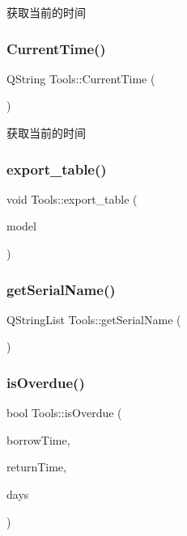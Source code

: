获取当前的时间 

\mbox{\label{class_tools_af10c90501143838d9af896a60026668d}} 
\subsubsection{\texorpdfstring{CurrentTime()}{CurrentTime()}}
{\footnotesize\ttfamily Q\+String Tools\+::\+Current\+Time (\begin{DoxyParamCaption}{ }\end{DoxyParamCaption})}



获取当前的时间 

\mbox{\label{class_tools_af6c4eaadfb21ee231cbc4d6384250629}} 
\subsubsection{\texorpdfstring{export\_table()}{export\_table()}}
{\footnotesize\ttfamily void Tools\+::export\+\_\+table (\begin{DoxyParamCaption}\item[{const Q\+Abstract\+Item\+Model \&}]{model }\end{DoxyParamCaption})}

\mbox{\label{class_tools_ac18eb440bd7a33e8e242df2cc4d4d4bc}} 
\subsubsection{\texorpdfstring{getSerialName()}{getSerialName()}}
{\footnotesize\ttfamily Q\+String\+List Tools\+::get\+Serial\+Name (\begin{DoxyParamCaption}{ }\end{DoxyParamCaption})}

\mbox{\label{class_tools_a178182aebac5d407b60720335c04822a}} 
\subsubsection{\texorpdfstring{isOverdue()}{isOverdue()}}
{\footnotesize\ttfamily bool Tools\+::is\+Overdue (\begin{DoxyParamCaption}\item[{Q\+String}]{borrow\+Time,  }\item[{Q\+String}]{return\+Time,  }\item[{int}]{days }\end{DoxyParamCaption})}

